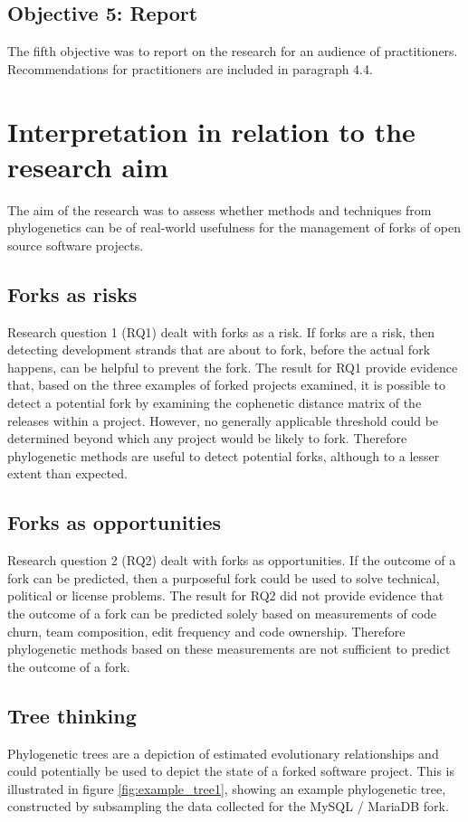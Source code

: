 \subsection{Objective 5: Report}
The fifth objective was to report on the research for an audience of practitioners. Recommendations for practitioners are included in paragraph 4.4.


\section{Interpretation in relation to the research aim}
The aim of the research was to assess whether methods and techniques from phylogenetics can be of real-world usefulness for the management of forks of open source software projects. 

\subsection{Forks as risks}
Research question 1 (RQ1) dealt with forks as a risk. If forks are a risk, then detecting development strands that are about to fork, before the actual fork happens, can be helpful to prevent the fork. The result for RQ1 provide evidence that, based on the three examples of forked projects examined, it is possible to detect a potential fork by examining the cophenetic distance matrix of the releases within a project. However, no generally applicable threshold could be determined beyond which any project would be likely to fork. Therefore phylogenetic methods are useful to detect potential forks, although to a lesser extent than expected.

\subsection{Forks as opportunities}
Research question 2 (RQ2) dealt with forks as opportunities. If the outcome of a fork can be predicted, then a purposeful fork could be used to solve technical, political or license problems. The result for RQ2 did not provide evidence that the outcome of a fork can be predicted solely based on measurements of code churn, team composition, edit frequency and code ownership. Therefore phylogenetic methods based on these measurements are not sufficient to predict the outcome of a fork.

\subsection{Tree thinking}
Phylogenetic trees are a depiction of estimated evolutionary relationships and could potentially be used to depict the state of a forked software project. This is illustrated in figure \ref{fig:example_tree1}, showing an example phylogenetic tree, constructed by subsampling the data collected for the MySQL / MariaDB fork. 

